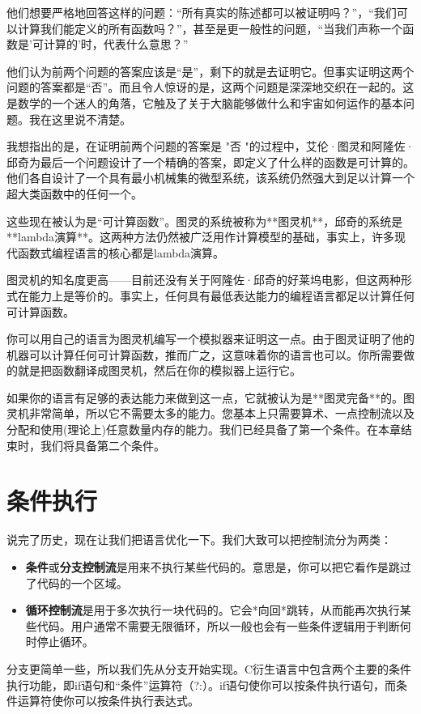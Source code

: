 \documentclass[cn,11pt,chinese]{elegantbook}
\begin{document}
他们想要严格地回答这样的问题：“所有真实的陈述都可以被证明吗？”，“我们可以计算我们能定义的所有函数吗？”，甚至是更一般性的问题，“当我们声称一个函数是'可计算的'时，代表什么意思？”

他们认为前两个问题的答案应该是“是”，剩下的就是去证明它。但事实证明这两个问题的答案都是“否”。而且令人惊讶的是，这两个问题是深深地交织在一起的。这是数学的一个迷人的角落，它触及了关于大脑能够做什么和宇宙如何运作的基本问题。我在这里说不清楚。

我想指出的是，在证明前两个问题的答案是 "否 "的过程中，艾伦·图灵和阿隆佐·邱奇为最后一个问题设计了一个精确的答案，即定义了什么样的函数是可计算的。他们各自设计了一个具有最小机械集的微型系统，该系统仍然强大到足以计算一个超大类函数中的任何一个。

这些现在被认为是“可计算函数”。图灵的系统被称为**图灵机**，邱奇的系统是**lambda演算**。这两种方法仍然被广泛用作计算模型的基础，事实上，许多现代函数式编程语言的核心都是lambda演算。

图灵机的知名度更高——目前还没有关于阿隆佐·邱奇的好莱坞电影，但这两种形式在能力上是等价的。事实上，任何具有最低表达能力的编程语言都足以计算任何可计算函数。

你可以用自己的语言为图灵机编写一个模拟器来证明这一点。由于图灵证明了他的机器可以计算任何可计算函数，推而广之，这意味着你的语言也可以。你所需要做的就是把函数翻译成图灵机，然后在你的模拟器上运行它。

如果你的语言有足够的表达能力来做到这一点，它就被认为是**图灵完备**的。图灵机非常简单，所以它不需要太多的能力。您基本上只需要算术、一点控制流以及分配和使用(理论上)任意数量内存的能力。我们已经具备了第一个条件。在本章结束时，我们将具备第二个条件。

\section{条件执行}

说完了历史，现在让我们把语言优化一下。我们大致可以把控制流分为两类：

\begin{itemize}
  \item \textbf{条件}或\textbf{分支控制流}是用来不执行某些代码的。意思是，你可以把它看作是跳过了代码的一个区域。
  \item \textbf{循环控制流}是用于多次执行一块代码的。它会*向回*跳转，从而能再次执行某些代码。用户通常不需要无限循环，所以一般也会有一些条件逻辑用于判断何时停止循环。
\end{itemize}

分支更简单一些，所以我们先从分支开始实现。C衍生语言中包含两个主要的条件执行功能，即if语句和“条件”运算符（?:）。if语句使你可以按条件执行语句，而条件运算符使你可以按条件执行表达式。
\end{document}
